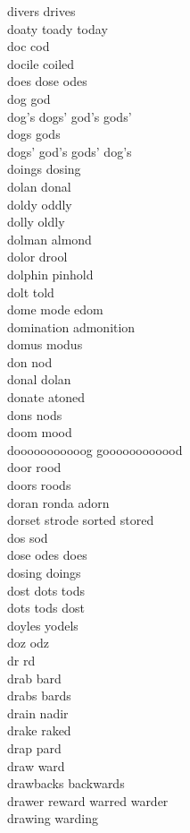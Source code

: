 divers drives\\
doaty toady today\\
doc cod\\
docile coiled\\
does dose odes\\
dog god\\
dog's dogs' god's gods'\\
dogs gods\\
dogs' god's gods' dog's\\
doings dosing\\
dolan donal\\
doldy oddly\\
dolly oldly\\
dolman almond\\
dolor drool\\
dolphin pinhold\\
dolt told\\
dome mode edom\\
domination admonition\\
domus modus\\
don nod\\
donal dolan\\
donate atoned\\
dons nods\\
doom mood\\
dooooooooooog goooooooooood\\
door rood\\
doors roods\\
doran ronda adorn\\
dorset strode sorted stored\\
dos sod\\
dose odes does\\
dosing doings\\
dost dots tods\\
dots tods dost\\
doyles yodels\\
doz odz\\
dr rd\\
drab bard\\
drabs bards\\
drain nadir\\
drake raked\\
drap pard\\
draw ward\\
drawbacks backwards\\
drawer reward warred warder\\
drawing warding\\
